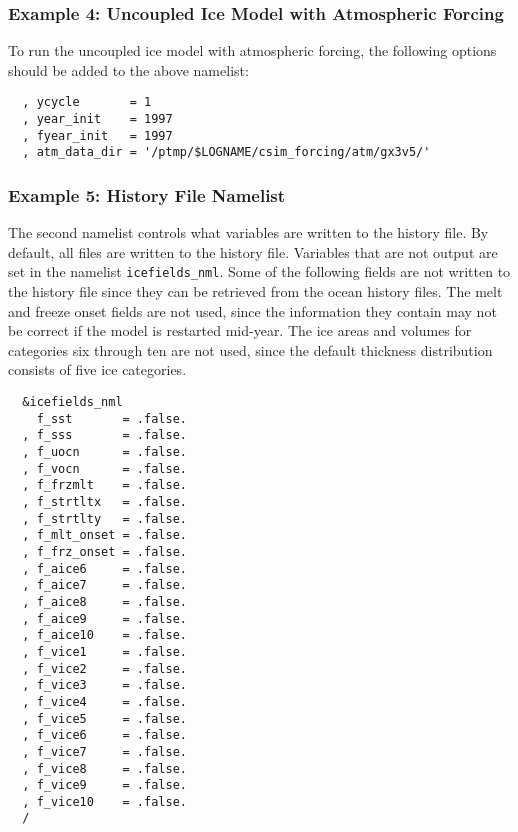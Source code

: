 \subsubsection {Example 4: Uncoupled Ice Model with Atmospheric Forcing}
\label{example4_nml}

To run the uncoupled ice model with atmospheric forcing, the following
options should be added to the above namelist:

\begin{verbatim}
  , ycycle       = 1
  , year_init    = 1997
  , fyear_init   = 1997
  , atm_data_dir = '/ptmp/$LOGNAME/csim_forcing/atm/gx3v5/'

\end{verbatim}


\subsubsection {Example 5: History File Namelist}
\label{example5_nml}

The second namelist controls what variables are written to the history file.
By default, all files are written to the history file.  Variables that
are not output are set in the namelist {\tt icefields\_nml}.
Some of the following fields are not written to the history file since
they can be retrieved from the ocean history files.  The melt and freeze
onset fields are not used, since the information they contain may not
be correct if the model is restarted mid-year.  The ice areas and volumes
for categories six through ten are not used, since the default thickness
distribution consists of five ice categories.

\begin{verbatim}
  &icefields_nml
    f_sst       = .false.
  , f_sss       = .false.
  , f_uocn      = .false.
  , f_vocn      = .false.
  , f_frzmlt    = .false.
  , f_strtltx   = .false.
  , f_strtlty   = .false.
  , f_mlt_onset = .false.
  , f_frz_onset = .false.
  , f_aice6     = .false.
  , f_aice7     = .false.
  , f_aice8     = .false.
  , f_aice9     = .false.
  , f_aice10    = .false.
  , f_vice1     = .false.
  , f_vice2     = .false.
  , f_vice3     = .false.
  , f_vice4     = .false.
  , f_vice5     = .false.
  , f_vice6     = .false.
  , f_vice7     = .false.
  , f_vice8     = .false.
  , f_vice9     = .false.
  , f_vice10    = .false.
  /
\end{verbatim}
